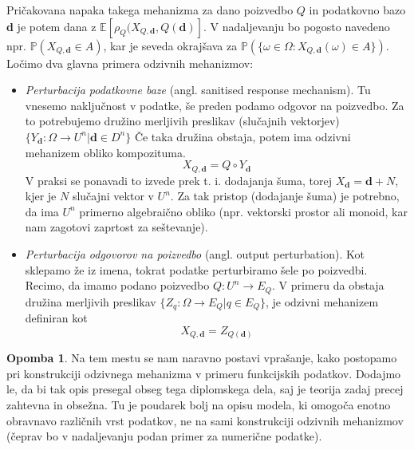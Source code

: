 \documentclass[12pt,a4paper]{amsart}
\theoremstyle{definition} %
\newtheorem{opomba}[definicija]{Opomba}
\theoremstyle{plain} %
\begin{document}
Pričakovana napaka takega mehanizma za dano poizvedbo $Q$ in podatkovno bazo \textbf{d} je potem dana z $\mathbb{E}[\rho_{Q}(X_{Q,\textbf{d}},Q(\textbf{d})]$. 
V nadaljevanju bo pogosto navedeno npr. $\mathbb{P}(X_{Q,\textbf{d}} \in A)$, kar je seveda okrajšava za $\mathbb{P}(\{\omega \in \Omega : X_{Q,\textbf{d}}(\omega) \in A \})$.
\newline
\newline
Ločimo dva glavna primera odzivnih mehanizmov:
\begin{itemize}
\item \textit{Perturbacija podatkovne baze} (angl. sanitised response mechanism). Tu vnesemo naključnost v podatke, še preden podamo odgovor na poizvedbo. Za to potrebujemo družino merljivih preslikav (slučajnih vektorjev) $\{ Y_{\textbf{d}}: \Omega \rightarrow U^n | \textbf{d} \in D^n\}$ Če taka družina obstaja, potem ima odzivni mehanizem obliko kompozituma.
\begin{equation}\label{odzivni2}
 X_{Q,\textbf{d}} = Q \circ Y_{\textbf{d}} \tag{2}
\end{equation} 
V praksi se ponavadi to izvede prek t. i. dodajanja šuma, torej $X_{\textbf{d}} = \textbf{d}+N$, kjer je $N$ slučajni vektor v $U^n$. Za tak pristop (dodajanje šuma) je potrebno, da ima $U^n$ primerno algebraično obliko (npr. vektorski prostor ali monoid, kar nam zagotovi zaprtost za seštevanje).
\item \textit{Perturbacija odgovorov na poizvedbo} (angl. output perturbation). Kot sklepamo že iz imena, tokrat podatke perturbiramo šele po poizvedbi. Recimo, da imamo podano poizvedbo $Q: U^n \rightarrow E_{Q}$. V primeru da obstaja družina merljivih preslikav $ \{Z_{q}:\Omega \rightarrow E_{Q} | q  \in E_{Q} \}$, je odzivni mehanizem definiran kot
\begin{equation}\label{odzivni3}
X_{Q,\textbf{d}}=Z_{Q(\textbf{d})}\tag{3}
\end{equation} 
\end{itemize}

\begin{opomba}Na tem mestu se nam naravno postavi vprašanje, kako postopamo pri konstrukciji odzivnega mehanizma v primeru funkcijskih podatkov. Dodajmo le, da bi tak opis presegal obseg tega diplomskega dela, saj je teorija zadaj precej zahtevna in obsežna. Tu je poudarek bolj na opisu modela, ki omogoča enotno obravnavo različnih vrst podatkov, ne na sami konstrukciji odzivnih mehanizmov (čeprav bo v nadaljevanju podan primer za numerične podatke).
\end{opomba}
\end{document}
